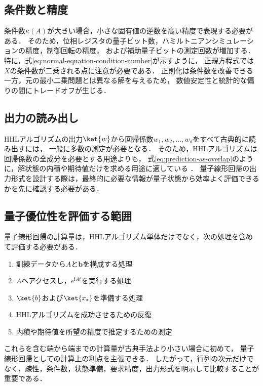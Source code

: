 \subsection{条件数と精度}
\label{subsec:condition-number-and-precision}

条件数$\kappa(A)$が大きい場合，小さな固有値の逆数を高い精度で表現する必要がある．
そのため，位相レジスタの量子ビット数，ハミルトニアンシミュレーションの精度，制御回転の精度，
および補助量子ビットの測定回数が増加する．
特に，式\eqref{eq:normal-equation-condition-number}が示すように，
正規方程式では$X$の条件数が二乗される点に注意が必要である．
正則化は条件数を改善できる一方，元の最小二乗問題とは異なる解を与えるため，
数値安定性と統計的な偏りの間にトレードオフが生じる．

\subsection{出力の読み出し}
\label{subsec:solution-readout}

HHLアルゴリズムの出力$\ket{w}$から回帰係数$w_1,w_2,\ldots,w_d$をすべて古典的に読み出すには，
一般に多数の測定が必要となる．
そのため，HHLアルゴリズムは回帰係数の全成分を必要とする用途よりも，
式\eqref{eq:prediction-as-overlap}のように，解状態の内積や期待値だけを求める用途に適している
\cite{hhl2009,wiebe2012}．
量子線形回帰の出力形式を設計する際は，最終的に必要な情報が量子状態から効率よく評価できるかを先に確認する必要がある．

\subsection{量子優位性を評価する範囲}
\label{subsec:end-to-end-evaluation}

量子線形回帰の計算量は，HHLアルゴリズム単体だけでなく，次の処理を含めて評価する必要がある．

\begin{enumerate}[(1)]
  \item 訓練データから$A$と$\bm{b}$を構成する処理
  \item $A$へアクセスし，$e^{\mathrm{i}At}$を実行する処理
  \item $\ket{b}$および$\ket{x_{*}}$を準備する処理
  \item HHLアルゴリズムを成功させるための反復
  \item 内積や期待値を所望の精度で推定するための測定
\end{enumerate}

これらを含む端から端までの計算量が古典手法より小さい場合に初めて，
量子線形回帰としての計算上の利点を主張できる．
したがって，行列の次元だけでなく，疎性，条件数，状態準備，要求精度，出力形式を明示して比較することが重要である．
